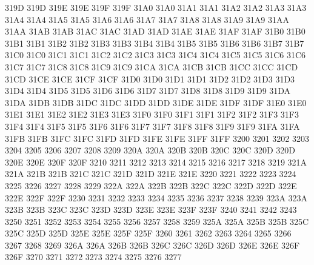 \ID 319D 319D
\ID 319E 319E
\ID 319F 319F
\ID 31A0 31A0
\ID 31A1 31A1
\ID 31A2 31A2
\ID 31A3 31A3
\ID 31A4 31A4
\ID 31A5 31A5
\ID 31A6 31A6
\ID 31A7 31A7
\ID 31A8 31A8
\ID 31A9 31A9
\ID 31AA 31AA
\ID 31AB 31AB
\ID 31AC 31AC
\ID 31AD 31AD
\ID 31AE 31AE
\ID 31AF 31AF
\ID 31B0 31B0
\ID 31B1 31B1
\ID 31B2 31B2
\ID 31B3 31B3
\ID 31B4 31B4
\ID 31B5 31B5
\ID 31B6 31B6
\ID 31B7 31B7
\ID 31C0 31C0
\ID 31C1 31C1
\ID 31C2 31C2
\ID 31C3 31C3
\ID 31C4 31C4
\ID 31C5 31C5
\ID 31C6 31C6
\ID 31C7 31C7
\ID 31C8 31C8
\ID 31C9 31C9
\ID 31CA 31CA
\ID 31CB 31CB
\ID 31CC 31CC
\ID 31CD 31CD
\ID 31CE 31CE
\ID 31CF 31CF
\ID 31D0 31D0
\ID 31D1 31D1
\ID 31D2 31D2
\ID 31D3 31D3
\ID 31D4 31D4
\ID 31D5 31D5
\ID 31D6 31D6
\ID 31D7 31D7
\ID 31D8 31D8
\ID 31D9 31D9
\ID 31DA 31DA
\ID 31DB 31DB
\ID 31DC 31DC
\ID 31DD 31DD
\ID 31DE 31DE
\ID 31DF 31DF
\ID 31E0 31E0
\ID 31E1 31E1
\ID 31E2 31E2
\ID 31E3 31E3
\NS 31F0 31F0
\NS 31F1 31F1
\NS 31F2 31F2
\NS 31F3 31F3
\NS 31F4 31F4
\NS 31F5 31F5
\NS 31F6 31F6
\NS 31F7 31F7
\NS 31F8 31F8
\NS 31F9 31F9
\NS 31FA 31FA
\NS 31FB 31FB
\NS 31FC 31FC
\NS 31FD 31FD
\NS 31FE 31FE
\NS 31FF 31FF
 3200
 3201
 3202
 3203
 3204
 3205
 3206
 3207
 3208
 3209
\ID 320A 320A
\ID 320B 320B
\ID 320C 320C
\ID 320D 320D
\ID 320E 320E
\ID 320F 320F
 3210
 3211
 3212
 3213
 3214
 3215
 3216
 3217
 3218
 3219
\ID 321A 321A
\ID 321B 321B
\ID 321C 321C
\ID 321D 321D
\ID 321E 321E
 3220
 3221
 3222
 3223
 3224
 3225
 3226
 3227
 3228
 3229
\ID 322A 322A
\ID 322B 322B
\ID 322C 322C
\ID 322D 322D
\ID 322E 322E
\ID 322F 322F
 3230
 3231
 3232
 3233
 3234
 3235
 3236
 3237
 3238
 3239
\ID 323A 323A
\ID 323B 323B
\ID 323C 323C
\ID 323D 323D
\ID 323E 323E
\ID 323F 323F
 3240
 3241
 3242
 3243
 3250
 3251
 3252
 3253
 3254
 3255
 3256
 3257
 3258
 3259
\ID 325A 325A
\ID 325B 325B
\ID 325C 325C
\ID 325D 325D
\ID 325E 325E
\ID 325F 325F
 3260
 3261
 3262
 3263
 3264
 3265
 3266
 3267
 3268
 3269
\ID 326A 326A
\ID 326B 326B
\ID 326C 326C
\ID 326D 326D
\ID 326E 326E
\ID 326F 326F
 3270
 3271
 3272
 3273
 3274
 3275
 3276
 3277
